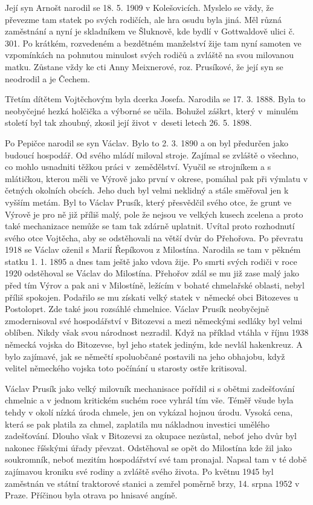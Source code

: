 \documentclass[../dejiny-rodu-prusiku.tex]{subfiles}
\begin{document}
Její syn Arnošt narodil se 18. 5. 1909 v Kolešovicích. Myslelo se vždy, že převezme tam statek po svých rodi­čích, ale hra osudu byla jiná. Měl různá zaměstnání a nyní je skladníkem ve Šluknově, kde bydlí v Gottwaldo­vě ulici č. 301. Po krátkém, rozvedeném a bezdětném
manželství žije tam nyní samoten ve vzpomínkách na pohnutou minulost svých rodičů a zvláště na svou milovanou matku. Zůstane vždy ke cti Anny Meixnerové, roz. Prusíkové, že její syn se neodrodil a je Čechem.

Třetím dítětem Vojtěchovým byla dcerka Josefa. Narodila se 17. 3. 1888. Byla to neobyčejné hezká holčička a výborné se učila. Bohužel záškrt, který v minulém století byl tak zhoubný, zkosil její život v deseti letech 26. 5. 1898.

Po Pepičce narodil se syn Václav. Bylo to 2. 3. 1890 a on byl předurčen jako budoucí hospodář. Od svého mládí miloval stroje. Zajímal se zvláště o všechno, co mohlo usnadniti těžkou práci v zemědělství. Vyučil se strojníkem a s mlátičkou, kterou měli ve Výrově jako první v okrese, pomáhal pak při výmlatu v četných okol­ních obcích. Jeho duch byl velmi neklidný a stále směřoval jen k vyšším metám. Byl to Václav Prusík, který přesvědčil svého otce, že grunt ve Výrově je pro ně již příliš malý, pole že nejsou ve velkých kusech zcelena a proto také mechanizace nemůže se tam tak zdárně uplatnit. Uvítal proto rozhodnutí svého otce Vojtěcha, aby se odstěhovali na větší dvůr do Přehořova. Po pře­vratu 1918 se Václav oženil s Marií Řepíkovou z Milostína. Narodila se tam v pěkném statku 1. 1. 1895 a dnes tam ještě jako vdova žije. Po smrti svých rodiči v roce 1920 odstěhoval se Václav do Milostína. Přehořov zdál se mu již zase malý jako před tím Výrov a pak ani v Milostíně, ležícím v bohaté chmelařské oblasti, nebyl příliš spokojen. Podařilo se mu získati velký statek v německé obci Bitozeves u Postoloprt. Zde také jsou rozsáhlé chmelnice. Václav Prusík neobyčejně zmodernisoval své hospodářství v Bitozevsi a mezi německými sedláky byl velmi oblíben. Nikdy však svou národnost nezradil. Když na příklad vtáhla v říjnu 1938 německá vojska do Bitozevse, byl jeho statek jediným, kde nevlál hakenkreuz. A bylo zajímavé, jak se němečtí spoluobčané postavili na jeho obhajobu, když velitel německého vojska toto po­čínání u starosty ostře kritisoval.

Václav Prusík jako velký milovník mechanisace pořídil si s obětmi zadešťování chmelnic a v jednom kritickém suchém roce vyhrál tím vše. Téměř všude byla tehdy v okolí nízká úroda chmele, jen on vykázal hojnou úrodu. Vysoká cena, která se pak platila za chmel, zaplatila mu nákladnou investici umělého zadešťování. Dlouho však v Bitozevsi za okupace nezůstal, neboť jeho dvůr byl nakonec říšskými úřady převzat. Odstěhoval se opět do Milostína kde žil jako soukromník, neboť mezitím hospo­dářství své tam pronajal. Napsal tam v té době zajímavou kroniku své rodiny a zvláště svého života. Po květnu 1945 byl zaměstnán ve státní traktorové stanici a zemřel po­měrně brzy, 14. srpna 1952 v Praze. Příčinou byla otrava po hnisavé angíně.
\end{document}
